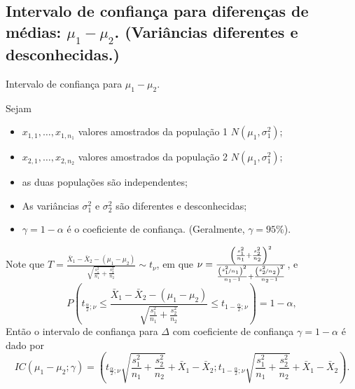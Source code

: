\documentclass[9pt]{beamer}
\begin{document}
\subsection{Intervalo de confiança para diferenças de médias: $\mu_1 - \mu_2$. (Variâncias diferentes e desconhecidas.)}

\begin{frame}{Intervalo de confiança para $\mu_1 - \mu_2$.}

\normalsize

Sejam
\begin{itemize}
	\item $x_{1,1}, \dots, x_{1,n_1}$ valores amostrados da população 1 $N(\mu_1, \sigma_1^2)$;
	\item $x_{2,1}, \dots, x_{2,n_2}$ valores amostrados da população 2 $N(\mu_1, \sigma_1^2)$;
	\item as duas populações são independentes;
	\item As variâncias $\sigma_1^2$ e $\sigma_2^2$ são diferentes e desconhecidas; 
	\item $\gamma=1-\alpha$ é o coeficiente de confiança. (Geralmente, $\gamma=95\%$).
\end{itemize}

Note que $T = \frac{\bar{X}_1  - \bar{X}_2 -(\mu_1 - \mu_2) }{\sqrt{\frac{s_1^2}{n_1} + \frac{s_2^2}{n_2}}} \sim t_\nu$, em que $\nu = \frac{\left( \frac{s_1^2}{n_1} + \frac{s_2^2}{n_2} \right)^2}{\frac{\left(\nicefrac{s_1^2}{n_1}\right)^2}{n_1-1} + \frac{\left(\nicefrac{s_2^2}{n_2}\right)^2}{n_2-1}}$, e 
$$P\left( t_{\frac{\alpha}{2}; \nu} \leq \frac{\bar{X}_1  - \bar{X}_2 -(\mu_1 - \mu_2) }{\sqrt{\frac{s_1^2}{n_1} + \frac{s_2^2}{n_2}}} \leq t_{1-\frac{\alpha}{2}; \nu} \right) = 1 - \alpha,$$
Então o intervalo de confiança para $\Delta$ com coeficiente de confiança $\gamma=1-\alpha$ é dado por
{\scriptsize
	$$IC\left(\mu_1 - \mu_2; \gamma\right) = \left( t_{\frac{\alpha}{2}; \nu} \sqrt{\frac{s_1^2}{n_1} + \frac{s_2^2}{n_2}} + \bar{X}_1 - \bar{X}_2; t_{1-\frac{\alpha}{2}; \nu} \sqrt{\frac{s_1^2}{n_1} + \frac{s_2^2}{n_2}} + \bar{X}_1 - \bar{X}_2 \right).$$
}

\normalsize
\end{frame}
\end{document}
